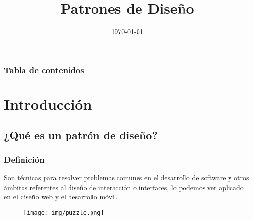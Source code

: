 \documentclass{beamer}
\title[Patrones de Diseño]{Patrones de Diseño} %
\author{} %
\institute[UNAM] %
{
Sánchez Morales Rodrigo Alejandro \\
\medskip
Universidad Nacional Autónoma de México \\ %
Facultad de Ciencias \\
\medskip
\textit{Programación de Dispositivos Móviles, 2019-II} %
}
\date{\today} %
\begin{document}
\begin{frame}
\titlepage %
\end{frame}

\begin{frame}
\frametitle{Tabla de contenidos} %
\tableofcontents %
\end{frame}


\section{Introducción} %

\subsection{¿Qué es un patrón de diseño?} %

\begin{frame}
\frametitle{Definición}
\begin{block}{}
\justify
Son técnicas para resolver problemas comunes en el desarrollo de software y otros ámbitos referentes al diseño de interacción o interfaces, lo podemos ver aplicado en el diseño web y el desarrollo móvil.
\end{block}

\begin{figure}
\centering
  \texttt{[image: img/puzzle.png]}
\end{figure}
\end{frame}
\end{document}
